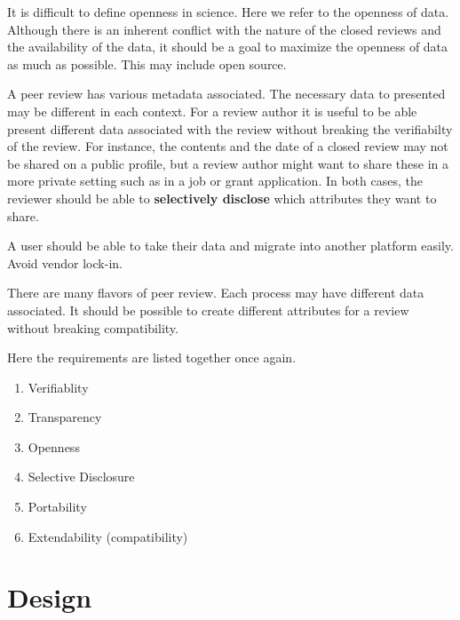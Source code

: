 It is difficult to define openness in science. Here we refer to the openness of data. Although there is an inherent conflict with the nature of the closed reviews and the availability of the data, it should be a goal to maximize the openness of data as much as possible. This may include open source.

A peer review has various metadata associated. The necessary data to presented may be different in each context. For a review author it is useful to be able present different data associated with the review without breaking the verifiabilty of the review. For instance, the contents and the date of a closed review may not be shared on a public profile, but a review author might want to share these in a more private setting such as in a job or grant application. In both cases, the reviewer should be able to \textbf{selectively disclose} which attributes they want to share.

A user should be able to take their data and migrate into another platform easily. Avoid vendor lock-in. 

There are many flavors of peer review. Each process may have different data associated. It should be possible to create different attributes for a review without breaking compatibility.

Here the requirements are listed together once again.
\begin{enumerate}
  \item Verifiablity
  \item Transparency
  \item Openness
  \item Selective Disclosure
  \item Portability
  \item Extendability (compatibility)
\end{enumerate}

\section{Design}



